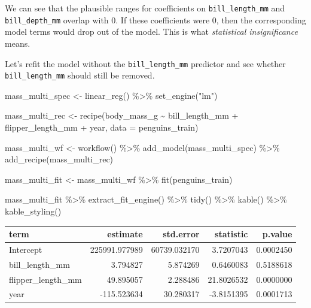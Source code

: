 \documentclass[
  letterpaper,
  DIV=11,
  numbers=noendperiod]{scrartcl}
\newenvironment{Shaded}{\begin{snugshade}}{\end{snugshade}}
\newcommand{\AttributeTok}[1]{\textcolor[rgb]{0.40,0.45,0.13}{#1}}
\newcommand{\FunctionTok}[1]{\textcolor[rgb]{0.28,0.35,0.67}{#1}}
\newcommand{\NormalTok}[1]{\textcolor[rgb]{0.00,0.23,0.31}{#1}}
\newcommand{\OtherTok}[1]{\textcolor[rgb]{0.00,0.23,0.31}{#1}}
\newcommand{\SpecialCharTok}[1]{\textcolor[rgb]{0.37,0.37,0.37}{#1}}
\newcommand{\StringTok}[1]{\textcolor[rgb]{0.13,0.47,0.30}{#1}}
\begin{document}
We can see that the plausible ranges for coefficients on
\texttt{bill\_length\_mm} and \texttt{bill\_depth\_mm} overlap with
\(0\). If these coefficients were \(0\), then the corresponding model
terms would drop out of the model. This is what \emph{statistical
insignificance} means.

Let's refit the model without the \texttt{bill\_length\_mm} predictor
and see whether \texttt{bill\_length\_mm} should still be removed.

\begin{Shaded}
\begin{Highlighting}[]
\NormalTok{mass\_multi\_spec }\OtherTok{\textless{}{-}} \FunctionTok{linear\_reg}\NormalTok{() }\SpecialCharTok{\%\textgreater{}\%}
  \FunctionTok{set\_engine}\NormalTok{(}\StringTok{"lm"}\NormalTok{)}

\NormalTok{mass\_multi\_rec }\OtherTok{\textless{}{-}} \FunctionTok{recipe}\NormalTok{(body\_mass\_g }\SpecialCharTok{\textasciitilde{}}\NormalTok{ bill\_length\_mm }\SpecialCharTok{+}\NormalTok{ flipper\_length\_mm }\SpecialCharTok{+}\NormalTok{ year, }\AttributeTok{data =}\NormalTok{ penguins\_train)}

\NormalTok{mass\_multi\_wf }\OtherTok{\textless{}{-}} \FunctionTok{workflow}\NormalTok{() }\SpecialCharTok{\%\textgreater{}\%}
  \FunctionTok{add\_model}\NormalTok{(mass\_multi\_spec) }\SpecialCharTok{\%\textgreater{}\%}
  \FunctionTok{add\_recipe}\NormalTok{(mass\_multi\_rec)}

\NormalTok{mass\_multi\_fit }\OtherTok{\textless{}{-}}\NormalTok{ mass\_multi\_wf }\SpecialCharTok{\%\textgreater{}\%}
  \FunctionTok{fit}\NormalTok{(penguins\_train)}

\NormalTok{mass\_multi\_fit }\SpecialCharTok{\%\textgreater{}\%}
  \FunctionTok{extract\_fit\_engine}\NormalTok{() }\SpecialCharTok{\%\textgreater{}\%}
  \FunctionTok{tidy}\NormalTok{() }\SpecialCharTok{\%\textgreater{}\%}
  \FunctionTok{kable}\NormalTok{() }\SpecialCharTok{\%\textgreater{}\%}
  \FunctionTok{kable\_styling}\NormalTok{()}
\end{Highlighting}
\end{Shaded}

\begin{longtable}[t]{lrrrr}
\toprule
term & estimate & std.error & statistic & p.value\\
\midrule
Intercept & 225991.977989 & 60739.032170 & 3.7207043 & 0.0002450\\
bill\_length\_mm & 3.794827 & 5.874269 & 0.6460083 & 0.5188618\\
flipper\_length\_mm & 49.895057 & 2.288486 & 21.8026532 & 0.0000000\\
year & -115.523634 & 30.280317 & -3.8151395 & 0.0001713\\
\bottomrule
\end{longtable}
\end{document}
